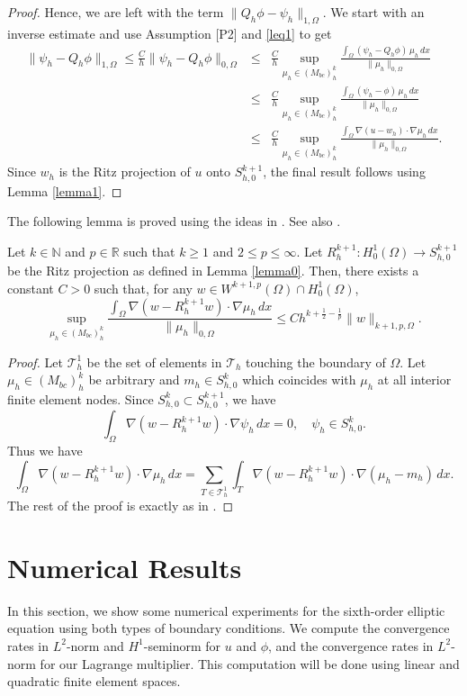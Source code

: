 \documentclass[a4paper,final]{siamltex}
\newcommand{\CT}{\mathcal{T}}
\newcommand{\Mb}{{(M_{bc})}}
\newcommand{\BBR}{\mbox{$\mathbb{R}$}}
\newcommand{\BBN}{\mbox{$\mathbb{N}$}}
\begin{document}
\begin{proof}
Hence, we are left with the term $\|Q_h\phi-\psi_h\|_{1,\Omega}$.
We start with an inverse estimate and use Assumption [P2] and \eqref{leq1} to get 
\begin{eqnarray*}
 \|\psi_h-Q_h\phi\|_{1,\Omega} \leq \frac{C}{h}  \|\psi_h-Q_h\phi\|_{0,\Omega} 
 &\leq& \frac{C}{h}\sup_{\mu_h \in {\Mb^k_h}}
  \frac{\int_{\Omega} (\psi_h-Q_h \phi)\,\mu_h\,dx}{\|\mu_h\|_{0,\Omega}}\\ &\leq& 
\frac{C}{h}\sup_{\mu_h \in {\Mb^k_h}}\frac{\int_{\Omega} (\psi_h- \phi)\,\mu_h\,dx}{\|\mu_h\|_{0,\Omega}}\\ &\leq& 
\frac{C}{h}\sup_{\mu_h \in {\Mb^k_h}} \frac{\int_{\Omega} \nabla (u-w_h)\cdot\nabla \mu_h\,dx}{\|\mu_h\|_{0,\Omega}}.
\end{eqnarray*}
Since $w_h$ is the Ritz projection of $u$ onto $S^{k+1}_{h,0}$, 
the final result follows using 
Lemma \ref{lemma1}. \end{proof}

The following lemma is proved using the ideas in \cite[Lemma 3.2]{GR86}.
See also  \cite{Sch78}. 
\begin{lemma}\label{lemma1}
Let $k \in \BBN$ and $p \in \BBR$ such that $k\geq 1$ 
and $2\leq p \leq \infty$. Let $R_h^{k+1}:H^1_0(\Omega)\to S_{h,0}^{k+1}$ be the Ritz projection as defined in 
Lemma \ref{lemma0}. {Then, there exists a constant $C>0$
such that, for any $ w\in W^{k+1,p}(\Omega)\cap H_0^1(\Omega)$,}
\begin{equation}\label{lest}
\sup_{\mu_h \in \Mb^k_h}\frac{\int_{\Omega}\nabla (w-R_h^{k+1}w)\cdot\nabla \mu_h\,dx}
{\|\mu_h\|_{0,\Omega}} \leq C h^{k+\frac{1}{2}-\frac{1}{p}}\|w\|_{k+1,p,\Omega}. 
 \end{equation}
\end{lemma}

\begin{proof}
Let $\CT_h^1$ be the set of elements in $\CT_h$ touching the boundary of $\Omega$. 
Let $\mu_h \in \Mb_h^k$ be arbitrary and $m_h\in S_{h,0}^k$ which coincides with $\mu_h$ at all interior finite element nodes. 
Since $ S_{h,0}^k \subset S_{h,0}^{k+1}$, we have 
\[ \int_{\Omega} \nabla (w-R_h^{k+1} w)\cdot\nabla \psi_h\,dx =0,\quad \psi_h \in S_{h,0}^k.\]
Thus we have 
\[ \int_{\Omega} \nabla (w-R_h^{k+1} w)\cdot\nabla \mu_h\,dx = 
\sum_{T \in \CT_h^1} \int_{T} \nabla (w-R_h^{k+1} w)\cdot\nabla (\mu_h-m_h) \,dx.\]
The rest of the proof is exactly as in \cite[Lemma 3.2]{GR86}.
\end{proof}

\section{Numerical Results}\label{sec:numer}
In this section, we show some numerical experiments for the sixth-order elliptic equation using both types of boundary conditions. We compute the convergence rates in $L^2$-norm and $H^1$-seminorm for $u$ and $\phi$, and the convergence rates in $L^2$-norm for our Lagrange multiplier. This computation will be done using linear and quadratic finite element spaces.
\end{document}
